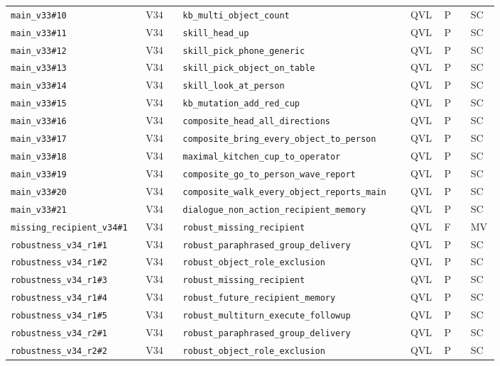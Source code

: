 \begin{landscape}
\begin{longtable}{@{}p{0.205\linewidth}p{0.075\linewidth}p{0.35\linewidth}p{0.06\linewidth}p{0.055\linewidth}p{0.055\linewidth}@{}}
\nolinkurl{main_v33#10} & V34 & \nolinkurl{kb_multi_object_count} & QVL & P & SC\\
\nolinkurl{main_v33#11} & V34 & \nolinkurl{skill_head_up} & QVL & P & SC\\
\nolinkurl{main_v33#12} & V34 & \nolinkurl{skill_pick_phone_generic} & QVL & P & SC\\
\nolinkurl{main_v33#13} & V34 & \nolinkurl{skill_pick_object_on_table} & QVL & P & SC\\
\nolinkurl{main_v33#14} & V34 & \nolinkurl{skill_look_at_person} & QVL & P & SC\\
\nolinkurl{main_v33#15} & V34 & \nolinkurl{kb_mutation_add_red_cup} & QVL & P & SC\\
\nolinkurl{main_v33#16} & V34 & \nolinkurl{composite_head_all_directions} & QVL & P & SC\\
\nolinkurl{main_v33#17} & V34 & \nolinkurl{composite_bring_every_object_to_person} & QVL & P & SC\\
\nolinkurl{main_v33#18} & V34 & \nolinkurl{maximal_kitchen_cup_to_operator} & QVL & P & SC\\
\nolinkurl{main_v33#19} & V34 & \nolinkurl{composite_go_to_person_wave_report} & QVL & P & SC\\
\nolinkurl{main_v33#20} & V34 & \nolinkurl{composite_walk_every_object_reports_main} & QVL & P & SC\\
\nolinkurl{main_v33#21} & V34 & \nolinkurl{dialogue_non_action_recipient_memory} & QVL & P & SC\\
\nolinkurl{missing_recipient_v34#1} & V34 & \nolinkurl{robust_missing_recipient} & QVL & F & MV\\
\nolinkurl{robustness_v34_r1#1} & V34 & \nolinkurl{robust_paraphrased_group_delivery} & QVL & P & SC\\
\nolinkurl{robustness_v34_r1#2} & V34 & \nolinkurl{robust_object_role_exclusion} & QVL & P & SC\\
\nolinkurl{robustness_v34_r1#3} & V34 & \nolinkurl{robust_missing_recipient} & QVL & P & SC\\
\nolinkurl{robustness_v34_r1#4} & V34 & \nolinkurl{robust_future_recipient_memory} & QVL & P & SC\\
\nolinkurl{robustness_v34_r1#5} & V34 & \nolinkurl{robust_multiturn_execute_followup} & QVL & P & SC\\
\nolinkurl{robustness_v34_r2#1} & V34 & \nolinkurl{robust_paraphrased_group_delivery} & QVL & P & SC\\
\nolinkurl{robustness_v34_r2#2} & V34 & \nolinkurl{robust_object_role_exclusion} & QVL & P & SC\\

\end{longtable}
\end{landscape}
